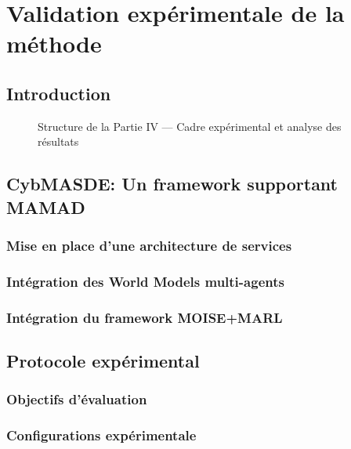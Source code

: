 \cleardoublepage
{}
\part{Validation expérimentale de la méthode}

\chapter*{Introduction}

\begin{figure}[h!]
    \centering
    \resizebox{\linewidth}{!}{%
        
    }
    \caption{Structure de la Partie IV — Cadre expérimental et analyse des résultats}
\end{figure}

\chapter{CybMASDE: Un framework supportant MAMAD}
\section{Mise en place d'une architecture de services}
\section{Intégration des World Models multi-agents}
\section{Intégration du framework MOISE+MARL}

\chapter{Protocole expérimental}
\section{Objectifs d'évaluation}
\section{Configurations expérimentale}

